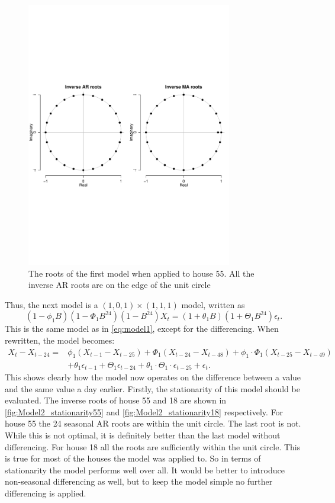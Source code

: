 \begin{figure}
    \centering
    \includegraphics[width=0.8\textwidth]{../../../figures/arimax/Stationarity_model1.pdf}
    \caption{The roots of the first model when applied to house 55. All the inverse AR roots are on the edge of the unit circle}
    \label{fig:Model1_stationarity}
\end{figure}

\noindent Thus, the next model is a $(1,0,1)\times(1,1,1)$ model, written as
\begin{equation}
    (1-\phi_1 B)(1-\Phi_1 B^{24})(1-B^{24})X_t = (1+\theta_1 B)(1+\Theta_1 B^{24}) \epsilon_t.
\end{equation}
This is the same model as in \cref{eq:model1}, except for the differencing. When rewritten, the model becomes:
\begin{align}
    X_t-X_{t-24} = &\phi_1 (X_{t-1}-X_{t-25}) + \Phi_1 (X_{t-24}-X_{t-48}) + \phi_1 \cdot \Phi_1  (X_{t-25}-X_{t-49})\nonumber  \\  &+ \theta_1 \epsilon_{t-1} + \Theta_1 \epsilon_{t-24} + \theta_1 \cdot \Theta_1 \cdot \epsilon_{t-25} + \epsilon_t. \label{model101111}
\end{align}
This shows clearly how the model now operates on the difference between a value and the same value a day earlier. Firstly, the stationarity of this model should be evaluated. The inverse roots of house 55 and 18 are shown in \cref{fig:Model2_stationarity55} and \cref{fig:Model2_stationarity18} respectively. For house 55 the 24 seasonal AR roots are within the unit circle. The last root is not. While this is not optimal, it is definitely better than the last model without differencing. For house 18 all the roots are sufficiently within the unit circle. This is true for most of the houses the model was applied to. So in terms of stationarity the model performs well over all. It would be better to introduce non-seasonal differencing as well, but to keep the model simple no further differencing is applied.


